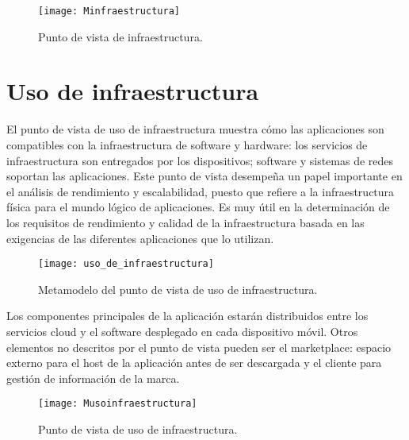 \begin{figure}[H]
\centering
\texttt{[image: Minfraestructura]}
\caption{Punto de vista de infraestructura.}
\label{Minfraestructura}
\end{figure}

\section{Uso de infraestructura}
El punto de vista de uso de infraestructura muestra cómo las aplicaciones son compatibles con la infraestructura de software y hardware: los servicios de infraestructura son entregados por los dispositivos; software y sistemas de redes soportan las aplicaciones. Este punto de vista desempeña un papel importante en el análisis de rendimiento y escalabilidad, puesto que refiere a la infraestructura física para el mundo lógico de aplicaciones. Es muy útil en la determinación de los requisitos de rendimiento y calidad de la infraestructura basada en las exigencias de las diferentes aplicaciones que lo utilizan.

\begin{figure}[H]
\centering
\texttt{[image: uso\_de\_infraestructura]}
\caption{Metamodelo del punto de vista de uso de infraestructura.}
\end{figure}


Los componentes principales de la aplicación estarán distribuidos entre los servicios cloud y el software desplegado en cada dispositivo móvil. Otros elementos no descritos por el punto de vista pueden ser el marketplace: espacio externo para el host de la aplicación antes de ser descargada y el cliente para gestión de información de la marca.

\begin{figure}[H]
\centering
\texttt{[image: Musoinfraestructura]}
\caption{Punto de vista de uso de infraestructura.}
\end{figure}



